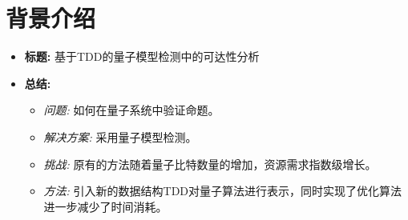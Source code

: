 \documentclass[aspectratio=1610]{ctexbeamer}
\begin{document}
\section{背景介绍}

\begin{frame}
    \begin{itemize}
        \item \textbf{标题:} 基于TDD的量子模型检测中的可达性分析
        \item \textbf{总结:}
        \begin{itemize}[itemsep=10pt]
            \item \textit{问题:} 如何在量子系统中验证命题。
            \item \textit{解决方案:} 采用量子模型检测。
            \item \textit{挑战:} 原有的方法随着量子比特数量的增加，资源需求指数级增长。
            \item \textit{方法:} 引入新的数据结构TDD对量子算法进行表示，同时实现了优化算法进一步减少了时间消耗。
        \end{itemize}
    \end{itemize}
\end{frame}
\end{document}
